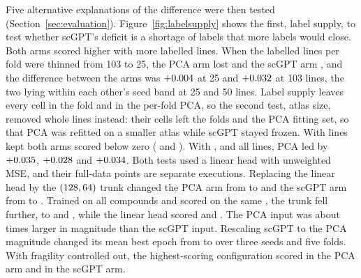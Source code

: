 Five alternative explanations of the difference were then tested (Section~\ref{sec:evaluation}).
Figure~\ref{fig:labelsupply} shows the first, label supply, to test whether scGPT's deficit is a
shortage of labels that more labels would close. Both arms scored higher with more labelled lines. When the labelled lines per fold were thinned from 103 to 25, the
PCA arm lost \CurveGainPca{} and the scGPT arm \CurveGainScgpt{}, and the difference between the arms was
$+0.004$ at 25 and $+0.032$ at 103 lines, the two lying within each other's seed band
at 25 and 50 lines. Label supply leaves every cell in the fold and in the per-fold PCA, so the second
test, atlas size, removed whole lines instead: their cells left the folds and the PCA fitting set, so
that PCA was refitted on a smaller atlas while scGPT stayed frozen. With \EtwoKeepMin{} lines kept both
arms scored below zero (\EtwoPcaMin{} and \EtwoScgptMin{}). With \EtwoKeepA{}, \EtwoKeepB{} and all
\NLinesCV{} lines, PCA led by $+0.035$, $+0.028$ and $+0.034$. Both tests used a linear
head with unweighted MSE, and their full-data points are separate executions.
Replacing the linear head by the $(128,64)$ trunk changed the PCA arm from \ArchLinPca{} to
\ArchTrunkPca{} and the scGPT arm from \ArchLinScgpt{} to \ArchTrunkScgpt{}. Trained on all
\NDrugsModelled{} compounds and scored on the same \NPanel{}, the trunk fell further, to \HdPanTrunkPca{}
and \HdPanTrunkScgpt{}, while the linear head scored \HdPanLinPca{} and \HdPanLinScgpt{}.
The PCA input was about
\InputScaleRatio{} times larger in magnitude than the scGPT input.
Rescaling scGPT to the PCA magnitude changed its mean best epoch from \ScaleEpochNative{} to
\ScaleEpochScaled{} over three seeds and five folds.
With fragility controlled out, the highest-scoring
configuration scored \FragBestPca{} in the PCA arm and \FragBestScgpt{} in the scGPT arm.

